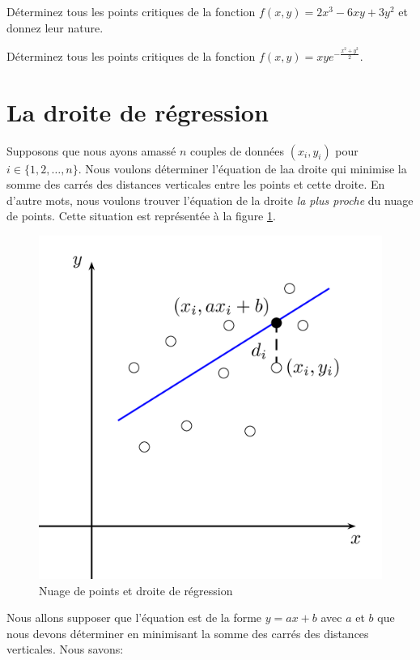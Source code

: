 \documentclass[]{book}
\theoremstyle{definition}
\theoremstyle{definition}
\theoremstyle{definition}
\theoremstyle{remark}
\let\BeginKnitrBlock\begin \let\EndKnitrBlock\end
\begin{document}
\BeginKnitrBlock{example}
\protect\hypertarget{exm:unnamed-chunk-216}{}{\label{exm:unnamed-chunk-216}
}Déterminez tous les points critiques de la fonction
\(f(x,y)=2x^3-6xy+3y^2\) et donnez leur nature.
\EndKnitrBlock{example}
\vspace*{8cm}

\BeginKnitrBlock{example}
\protect\hypertarget{exm:unnamed-chunk-217}{}{\label{exm:unnamed-chunk-217}
}Déterminez tous les points critiques de la fonction
\(f(x,y)=xye^{-\frac{x^2+y^2}{2}}\).
\EndKnitrBlock{example}
\vspace*{8cm}

\hypertarget{la-droite-de-regression}{%
\section{La droite de régression}\label{la-droite-de-regression}}

Supposons que nous ayons amassé \(n\) couples de données \((x_i,y_i)\)
pour \(i\in \{1,2,\ldots, n\}\). Nous voulons déterminer l'équation de
laa droite qui minimise la somme des carrés des distances verticales
entre les points et cette droite. En d'autre mots, nous voulons trouver
l'équation de la droite \emph{la plus proche} du nuage de points. Cette
situation est représentée à la figure \ref{fig:droite-regression}.

\begin{figure}

{\centering \includegraphics[width=0.5\linewidth]{resources/images/latex/droiteregression} 

}

\caption{Nuage de points et droite de régression}\label{fig:droite-regression}
\end{figure}

Nous allons supposer que l'équation est de la forme \(y=ax+b\) avec
\(a\) et \(b\) que nous devons déterminer en minimisant la somme des
carrés des distances verticales. Nous savons:
\end{document}

